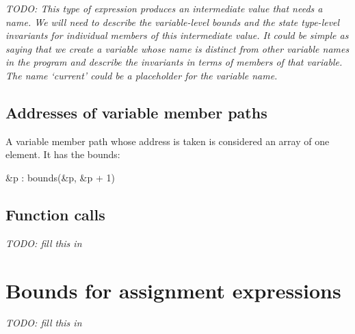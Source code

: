 \emph{TODO: This type of expression produces an intermediate value that
needs a name. We will need to describe the variable-level bounds and the
state type-level invariants for individual members of this intermediate
value. It could be simple as saying that we create a variable whose name
is distinct from other variable names in the program and describe the
invariants in terms of members of that variable. The name `current'
could be a placeholder for the variable name.}

\subsection{Addresses of variable member paths}\label{addresses-of-variable-member-paths}

A variable member path  whose address is taken is considered an
array of one element. It has the bounds:

\&p : bounds(\&p, \&p + 1)

\subsection{Function calls}\label{function-calls-1}

\emph{TODO: fill this in}

\section{Bounds for assignment expressions}\label{bounds-for-assignment-expressions}

\emph{TODO: fill this in}
